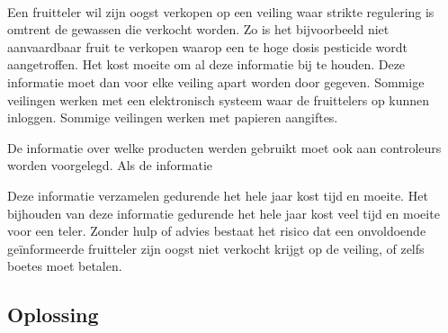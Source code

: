 \paragraph {} Een fruitteler wil zijn oogst verkopen op een veiling waar strikte regulering is
omtrent de gewassen die verkocht worden. Zo is het bijvoorbeeld niet aanvaardbaar fruit te
verkopen waarop een te hoge dosis pesticide wordt aangetroffen. Het kost moeite om al deze
informatie bij te houden. Deze informatie moet dan voor elke veiling apart worden door
gegeven. Sommige veilingen werken met een elektronisch systeem waar de fruittelers op kunnen
inloggen. Sommige veilingen werken met papieren aangiftes.

De informatie over welke producten werden gebruikt moet ook aan controleurs worden
voorgelegd. 
Als de informatie 

Deze informatie verzamelen gedurende het hele jaar kost tijd en moeite.
Het bijhouden van deze
informatie gedurende het hele jaar kost veel tijd en moeite voor een teler. Zonder hulp of
advies bestaat het risico dat een onvoldoende geïnformeerde fruitteler zijn oogst niet verkocht
krijgt op de veiling, of zelfs boetes moet betalen.


\subsection {Oplossing}

